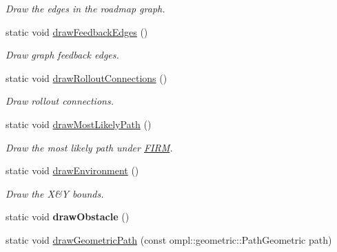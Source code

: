 \begin{DoxyCompactItemize}
\begin{DoxyCompactList}\small\item\em Draw the edges in the roadmap graph. \end{DoxyCompactList}\item 
\hypertarget{class_visualizer_ab484f66c1477eee940a90c436d320d1d}{static void \hyperlink{class_visualizer_ab484f66c1477eee940a90c436d320d1d}{draw\-Feedback\-Edges} ()}\label{class_visualizer_ab484f66c1477eee940a90c436d320d1d}

\begin{DoxyCompactList}\small\item\em Draw graph feedback edges. \end{DoxyCompactList}\item 
\hypertarget{class_visualizer_a3d9d939e1deef7f24c10d6ebbf794206}{static void \hyperlink{class_visualizer_a3d9d939e1deef7f24c10d6ebbf794206}{draw\-Rollout\-Connections} ()}\label{class_visualizer_a3d9d939e1deef7f24c10d6ebbf794206}

\begin{DoxyCompactList}\small\item\em Draw rollout connections. \end{DoxyCompactList}\item 
\hypertarget{class_visualizer_aae94674acda11f26522581791b310cb1}{static void \hyperlink{class_visualizer_aae94674acda11f26522581791b310cb1}{draw\-Most\-Likely\-Path} ()}\label{class_visualizer_aae94674acda11f26522581791b310cb1}

\begin{DoxyCompactList}\small\item\em Draw the most likely path under \hyperlink{class_f_i_r_m}{F\-I\-R\-M}. \end{DoxyCompactList}\item 
\hypertarget{class_visualizer_ada993e034ff9541d069d2e894ed51f5d}{static void \hyperlink{class_visualizer_ada993e034ff9541d069d2e894ed51f5d}{draw\-Environment} ()}\label{class_visualizer_ada993e034ff9541d069d2e894ed51f5d}

\begin{DoxyCompactList}\small\item\em Draw the X\&Y bounds. \end{DoxyCompactList}\item 
\hypertarget{class_visualizer_af4b7f35e3dff8daaf9cc79ac1f9140cd}{static void {\bfseries draw\-Obstacle} ()}\label{class_visualizer_af4b7f35e3dff8daaf9cc79ac1f9140cd}

\item 
\hypertarget{class_visualizer_a35dec37e9c258e2074f1b3ccf7e7a01c}{static void \hyperlink{class_visualizer_a35dec37e9c258e2074f1b3ccf7e7a01c}{draw\-Geometric\-Path} (const ompl\-::geometric\-::\-Path\-Geometric path)}\label{class_visualizer_a35dec37e9c258e2074f1b3ccf7e7a01c}


\end{DoxyCompactItemize}
